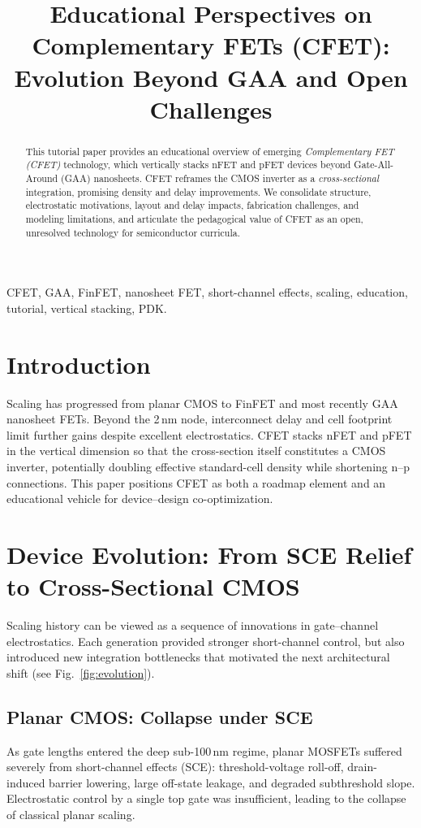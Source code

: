 \documentclass[conference]{IEEEtran}
\title{Educational Perspectives on Complementary FETs (CFET):\\
Evolution Beyond GAA and Open Challenges}
\author{
\IEEEauthorblockN{Shinichi Samizo}
\IEEEauthorblockA{Independent Semiconductor Researcher\\
Project Design Hub, Samizo-AITL\\
\textit{Email:} \href{mailto:shin3t72@gmail.com}{shin3t72@gmail.com}\quad
\textit{GitHub:} \href{https://github.com/Samizo-AITL}{Samizo-AITL}}
}
\begin{document}
\maketitle

\begin{abstract}
This tutorial paper provides an educational overview of emerging
\emph{Complementary FET (CFET)} technology, which vertically stacks nFET and pFET devices beyond Gate-All-Around (GAA) nanosheets.
CFET reframes the CMOS inverter as a \emph{cross-sectional} integration, promising density and delay improvements.
We consolidate structure, electrostatic motivations, layout and delay impacts, fabrication challenges, and modeling limitations, and articulate the pedagogical value of CFET as an open, unresolved technology for semiconductor curricula.
\end{abstract}

\begin{IEEEkeywords}
CFET, GAA, FinFET, nanosheet FET, short-channel effects, scaling, education, tutorial, vertical stacking, PDK.
\end{IEEEkeywords}

\section{Introduction}
Scaling has progressed from planar CMOS to FinFET and most recently GAA nanosheet FETs.
Beyond the 2\,nm node, interconnect delay and cell footprint limit further gains despite excellent electrostatics.
CFET stacks nFET and pFET in the vertical dimension so that the cross-section itself constitutes a CMOS inverter, potentially doubling effective standard-cell density while shortening n--p connections.
This paper positions CFET as both a roadmap element and an educational vehicle for device--design co-optimization.

\section{Device Evolution: From SCE Relief to Cross-Sectional CMOS}
Scaling history can be viewed as a sequence of innovations in
gate--channel electrostatics. Each generation provided stronger
short-channel control, but also introduced new integration
bottlenecks that motivated the next architectural shift (see Fig.~\ref{fig:evolution}).

\subsection{Planar CMOS: Collapse under SCE}
As gate lengths entered the deep sub-100\,nm regime, planar MOSFETs
suffered severely from short-channel effects (SCE): threshold-voltage
roll-off, drain-induced barrier lowering, large off-state leakage, and
degraded subthreshold slope. Electrostatic control by a single top gate
was insufficient, leading to the collapse of classical planar scaling.
\end{document}
